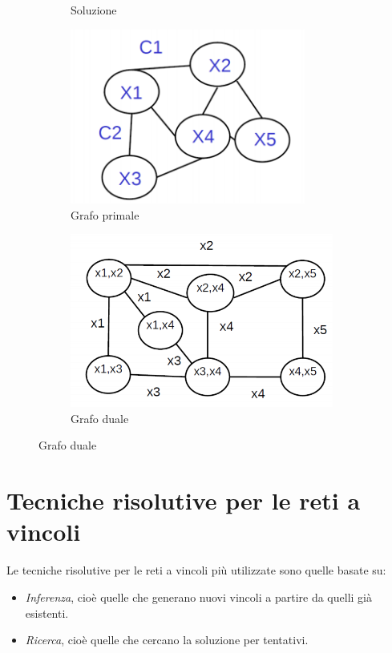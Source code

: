 \documentclass[11pt,oneside]{book}
\begin{document}
\begin{figure}[htp]
\begin{subfigure}{0.49\textwidth}
		\caption{Soluzione}
	\end{subfigure}
	\begin{subfigure}{0.49\textwidth}
	    \centering
		\includegraphics[width=0.85\textwidth]{primal.png}
		\caption{Grafo primale}
	\end{subfigure}
	\hfill
	\begin{subfigure}{0.49\textwidth}
	    \centering
		\includegraphics[width=0.95\textwidth]{dual.png}
		\caption{Grafo duale}
	\end{subfigure}
\end{figure}


\section{Tecniche risolutive per le reti a vincoli}
Le tecniche risolutive per le reti a vincoli più utilizzate sono quelle basate su:
\begin{itemize}
	\item \textit{Inferenza}, cioè quelle che generano nuovi vincoli a partire da quelli già esistenti.
	\item \textit{Ricerca}, cioè quelle che cercano la soluzione per tentativi.
\end{itemize}
\end{document}
